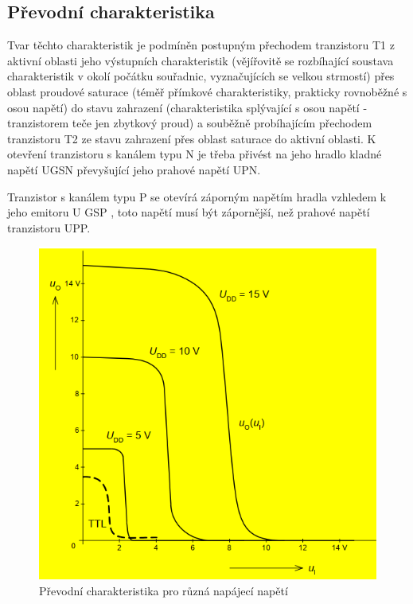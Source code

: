 \subsection{Převodní charakteristika}
Tvar těchto charakteristik je podmíněn postupným přechodem tranzistoru T1 z
aktivní oblasti jeho výstupních charakteristik (vějířovitě se rozbíhající soustava
charakteristik v okolí počátku souřadnic, vyznačujících se velkou strmostí) přes
oblast proudové saturace (téměř přímkové charakteristiky, prakticky rovnoběžné s
osou napětí) do stavu zahrazení (charakteristika splývající s osou napětí -
tranzistorem teče jen zbytkový proud) a souběžně probíhajícím přechodem
tranzistoru T2 ze stavu zahrazení přes oblast saturace do aktivní oblasti.
K otevření tranzistoru s kanálem typu N je třeba přivést na jeho hradlo kladné napětí
UGSN převyšující jeho prahové napětí UPN.

Tranzistor s kanálem typu P se otevírá záporným napětím hradla vzhledem k jeho
emitoru U
GSP , toto napětí musí být zápornější, než prahové napětí tranzistoru UPP.

   \begin{figure}[h]
   \begin{center}
     \includegraphics[scale=0.6]{images/PrevodCMOS.png}
   \end{center}
   \caption{Převodní charakteristika pro různá napájecí napětí}
  \end{figure}
  

